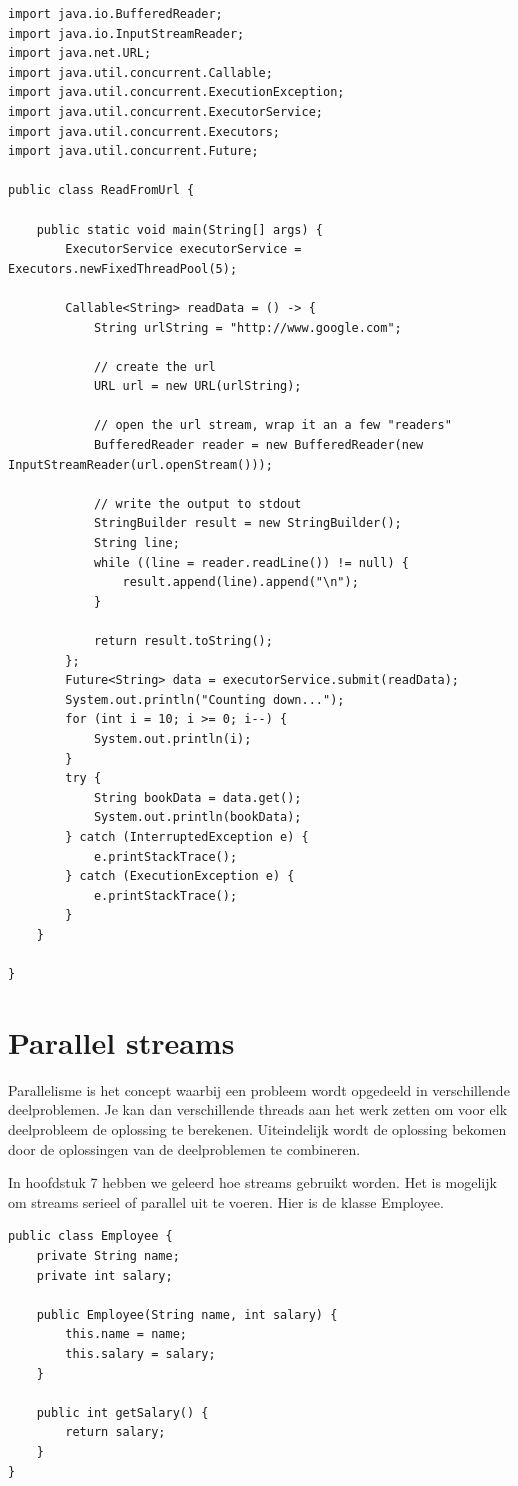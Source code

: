 \begin{lstlisting}
import java.io.BufferedReader;
import java.io.InputStreamReader;
import java.net.URL;
import java.util.concurrent.Callable;
import java.util.concurrent.ExecutionException;
import java.util.concurrent.ExecutorService;
import java.util.concurrent.Executors;
import java.util.concurrent.Future;

public class ReadFromUrl {

	public static void main(String[] args) {
		ExecutorService executorService = Executors.newFixedThreadPool(5);

		Callable<String> readData = () -> {
			String urlString = "http://www.google.com";

			// create the url
			URL url = new URL(urlString);

			// open the url stream, wrap it an a few "readers"
			BufferedReader reader = new BufferedReader(new InputStreamReader(url.openStream()));

			// write the output to stdout
			StringBuilder result = new StringBuilder();
			String line;
			while ((line = reader.readLine()) != null) {
				result.append(line).append("\n");
			}

			return result.toString();
		};
		Future<String> data = executorService.submit(readData);
		System.out.println("Counting down...");
		for (int i = 10; i >= 0; i--) {
			System.out.println(i);
		}
		try {
			String bookData = data.get();
			System.out.println(bookData);
		} catch (InterruptedException e) {
			e.printStackTrace();
		} catch (ExecutionException e) {
			e.printStackTrace();
		}
	}

}
\end{lstlisting}


\section{Parallel streams}

Parallelisme is het concept waarbij een probleem wordt opgedeeld in verschillende deelproblemen. Je kan dan verschillende threads aan het werk zetten om voor elk deelprobleem de oplossing te berekenen. Uiteindelijk wordt de oplossing bekomen door de oplossingen van de deelproblemen te combineren. 

In hoofdstuk 7 hebben we geleerd hoe streams gebruikt worden. Het is mogelijk om streams serieel of parallel uit te voeren. Hier is de klasse Employee.

\begin{lstlisting}
public class Employee {
	private String name;
	private int salary;

	public Employee(String name, int salary) {
		this.name = name;
		this.salary = salary;
	}

	public int getSalary() {
		return salary;
	}
}
\end{lstlisting}

